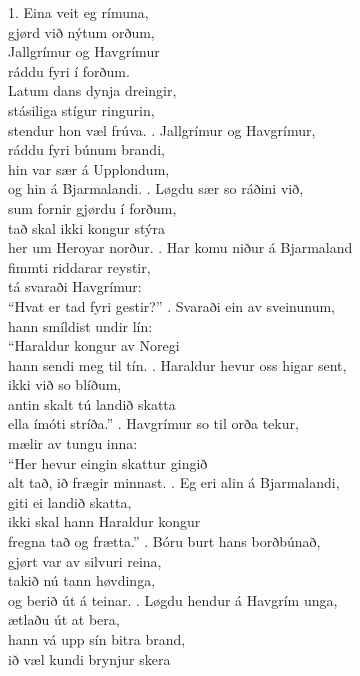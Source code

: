 1. Eina veit eg rímuna,\\
gjørd við nýtum orðum,\\
Jallgrímur og Havgrímur\\
ráddu fyri í forðum.
\hops
{} {}\\
 Latum dans dynja dreingir,\\
 stásiliga stígur ringurin,\\
 stendur hon væl frúva.
. Jallgrímur og Havgrímur,\\
ráddu fyri búnum brandi,\\
hin var sær á Upplondum,\\
og hin á Bjarmalandi.
. Løgdu sær so ráðini við,\\
sum fornir gjørdu í forðum,\\
tað skal ikki kongur stýra\\
her um Heroyar norður.
. Har komu niður á Bjarmaland\\
fimmti riddarar reystir,\\
tá svaraði Havgrímur:\\
“Hvat er tad fyri gestir?”
. Svaraði ein av sveinunum,\\
hann smíldist undir lín:\\
“Haraldur kongur av Noregi\\
hann sendi meg til tín.
. Haraldur hevur oss higar sent,\\
ikki við so blíðum,\\
antin skalt tú landið skatta\\
ella ímóti stríða.”
. Havgrímur so til orða tekur,\\
mælir av tungu inna:\\
“Her hevur eingin skattur gingið\\
alt tað, ið frægir minnast.
. Eg eri alin á Bjarmalandi,\\
giti ei landið skatta,\\
ikki skal hann Haraldur kongur\\
fregna tað og frætta.”
. Bóru burt hans borðbúnað,\\
gjørt var av silvuri reina,\\
takið nú tann høvdinga,\\
og berið út á teinar.
. Løgdu hendur á Havgrím unga,\\
ætlaðu út at bera,\\
hann vá upp sín bitra brand,\\
ið væl kundi brynjur skera

